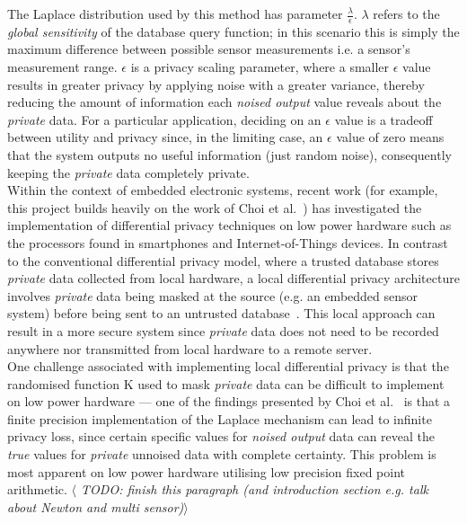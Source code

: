 \documentclass[12pt]{article}
\begin{document}
    The Laplace distribution used by this method has parameter $\frac{\lambda}{\epsilon}$. $\lambda$ refers to the \textit{global sensitivity} of the database query function; in this scenario this is simply the maximum difference between possible sensor measurements i.e. a sensor's measurement range. $\epsilon$ is a privacy scaling parameter, where a smaller $\epsilon$ value results in greater privacy by applying noise with a greater variance, thereby reducing the amount of information each \textit{noised output} value reveals about the \textit{private} data. For a particular application, deciding on an $\epsilon$ value is a tradeoff between utility and privacy since, in the limiting case, an $\epsilon$ value of zero means that the system outputs no useful information (just random noise), consequently keeping the \textit{private} data completely private.\\

    Within the context of embedded electronic systems, recent work (for example, this project builds heavily on the work of Choi et al.~\cite{Choi2018GuaranteeingLD}) has investigated the implementation of differential privacy techniques on low power hardware such as the processors found in smartphones and Internet-of-Things devices. In contrast to the conventional differential privacy model, where a trusted database stores \textit{private} data collected from local hardware, a local differential privacy architecture involves \textit{private} data being masked at the source (e.g. an embedded sensor system) before being sent to an untrusted database~\cite{Kairouz:2014}. This local approach can result in a more secure system since \textit{private} data does not need to be recorded anywhere nor transmitted from local hardware to a remote server.\\

    One challenge associated with implementing local differential privacy is that the randomised function K used to mask \textit{private} data can be difficult to implement on low power hardware --- one of the findings presented by Choi et al.~\cite{Choi2018GuaranteeingLD} is that a finite precision implementation of the Laplace mechanism can lead to infinite privacy loss, since certain specific values for \textit{noised output} data can reveal the \textit{true} values for \textit{private} unnoised data with complete certainty. This problem is most apparent on low power hardware utilising low precision fixed point arithmetic. \textit{$\langle$ TODO: finish this paragraph (and introduction section e.g. talk about Newton and multi sensor)$\rangle$}\\
\end{document}
